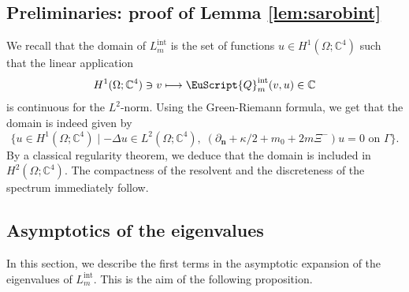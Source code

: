 \documentclass[10pt]{amsart}
\let\mathcal \EuScript
\newcommand\mto{\mathchoice{\longmapsto}{\mapsto}{\mapsto}{\mapsto}}
\newcommand{\cQ}{\mathcal{Q}}
\newcommand{\intt}{\mathrm{int}}
\let\sep\mid
\theoremstyle{plain}
\theoremstyle{definition}
\newcommand{\CC}{\mathbb{C}}
\newcommand{\bn}{{\boldsymbol n}}
\let\pa\partial
\begin{document}
\subsection{Preliminaries: proof of Lemma \ref{lem:sarobint}}\label{sec.Lintdef}
We recall that the domain of $L_m^\intt$ is the set of functions $u\in H^1(\Omega; \CC^4)$ such that the linear application
\[ H^1(\Omega; \CC^4)\ni v\mto \cQ_m^\intt(v,u)\in\CC\]
is continuous for the $L^2$-norm. Using the Green-Riemann formula, we get that the domain is indeed given by
\[\{u\in H^1(\Omega; \CC^4) \sep -\Delta u\in L^2(\Omega; \CC^4),\; (\pa_\bn + \kappa/2+m_0 + 2m\Xi^{-})u=0 \mbox{ on } \Gamma\}.\]
By a classical regularity theorem, we deduce that the domain is included in $H^2(\Omega;\CC^4)$.
The compactness of the resolvent and the discreteness of the spectrum immediately follow.
\subsection{Asymptotics of the eigenvalues}
In this section, we describe the first terms in the asymptotic expansion of the eigenvalues of $L_m^\intt$. This is the aim of the following proposition.
\end{document}
